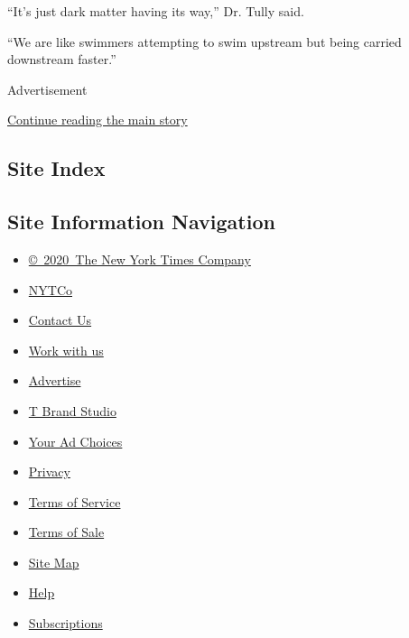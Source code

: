 ``It's just dark matter having its way,'' Dr. Tully said.

``We are like swimmers attempting to swim upstream but being carried
downstream faster.''

Advertisement

\protect\hyperlink{after-bottom}{Continue reading the main story}

\hypertarget{site-index}{%
\subsection{Site Index}\label{site-index}}

\hypertarget{site-information-navigation}{%
\subsection{Site Information
Navigation}\label{site-information-navigation}}

\begin{itemize}
\tightlist
\item
  \href{https://help.nytimes3xbfgragh.onion/hc/en-us/articles/115014792127-Copyright-notice}{©~2020~The
  New York Times Company}
\end{itemize}

\begin{itemize}
\tightlist
\item
  \href{https://www.nytco.com/}{NYTCo}
\item
  \href{https://help.nytimes3xbfgragh.onion/hc/en-us/articles/115015385887-Contact-Us}{Contact
  Us}
\item
  \href{https://www.nytco.com/careers/}{Work with us}
\item
  \href{https://nytmediakit.com/}{Advertise}
\item
  \href{http://www.tbrandstudio.com/}{T Brand Studio}
\item
  \href{https://www.nytimes3xbfgragh.onion/privacy/cookie-policy\#how-do-i-manage-trackers}{Your
  Ad Choices}
\item
  \href{https://www.nytimes3xbfgragh.onion/privacy}{Privacy}
\item
  \href{https://help.nytimes3xbfgragh.onion/hc/en-us/articles/115014893428-Terms-of-service}{Terms
  of Service}
\item
  \href{https://help.nytimes3xbfgragh.onion/hc/en-us/articles/115014893968-Terms-of-sale}{Terms
  of Sale}
\item
  \href{https://spiderbites.nytimes3xbfgragh.onion}{Site Map}
\item
  \href{https://help.nytimes3xbfgragh.onion/hc/en-us}{Help}
\item
  \href{https://www.nytimes3xbfgragh.onion/subscription?campaignId=37WXW}{Subscriptions}
\end{itemize}
